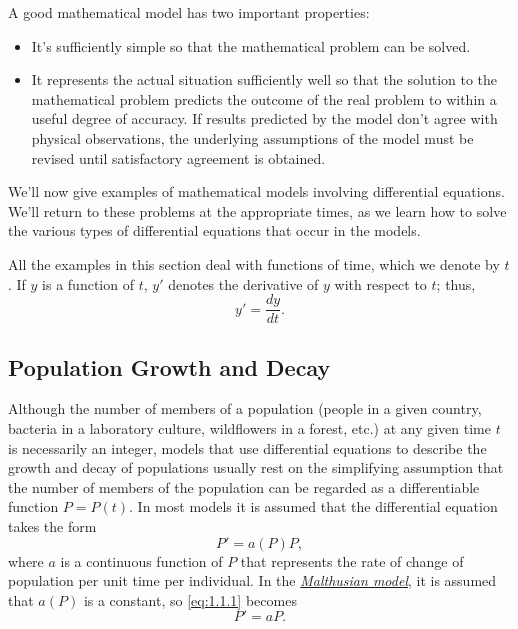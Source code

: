 \documentclass{ximera}
\begin{document}
A good mathematical model has two important properties:
 
\begin{itemize}
\item It's sufficiently simple so that the mathematical problem
can be solved.
 
\item It represents the actual situation sufficiently well so that the
solution to the mathematical problem predicts the outcome of the real
problem to within a useful degree of accuracy. If results predicted by
the model don't agree with physical observations, the
underlying
assumptions of the model must be revised until satisfactory agreement
is obtained.
\end{itemize}
 
We'll  now give  examples of mathematical models involving
differential equations. We'll return to these problems at the
appropriate times, as we learn how to solve the various types of
differential equations that occur in the models.
 
All the examples in this section deal with functions of time, which we
 denote by $t$. If $y$ is a function of $t$,  $y'$
denotes the derivative of $y$ with respect to $t$;   thus,
$$
y'=\frac{dy}{dt}.
$$
 
 
\subsection*{Population Growth and Decay}
 
Although the number of members of a population (people in a given
country, bacteria in a laboratory culture, wildflowers in a forest,
etc.)
at any given time $t$ is necessarily an integer, models that use
differential equations to describe the growth and decay of populations
usually rest on the simplifying assumption that the number of members of
the population can be regarded as a differentiable function $P=P(t)$.
In most models it is assumed that the differential equation takes the
form
\begin{equation} \label{eq:1.1.1}
P'=a(P)P,
\end{equation}
where $a$ is a continuous function of $P$ that represents the rate of
change of population per unit time per individual.
In the
\href{http://en.wikipedia.org/wiki/Thomas_Robert_Malthus}
{\textit{Malthusian model}},
 it is assumed that
$a(P)$ is a constant, so \eqref{eq:1.1.1} becomes
\begin{equation} \label{eq:1.1.2}
P'=aP.
\end{equation}
 
\end{document}

